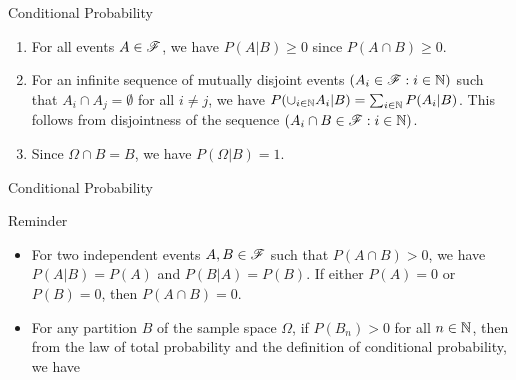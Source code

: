 \documentclass[12pt,aspectratio=169]{beamer}
\begin{document}
\begin{frame}{Conditional Probability}
\begin{Proof} 
\begin{enumerate}
\item <1-> [\textbf{Non-negativity:}] For all events $A \in \mathscr{F}$, we have $P(A|B) \ge 0$ since $P(A \cap B) \ge 0$. 
\item <2-> [\textbf{$\sigma$-additivity:}] For an infinite sequence of mutually disjoint events $(A_i \in \mathscr{F}: i \in \mathbb{N})$ such that $A_i \cap A_j = \emptyset$ for all $i \neq j$, we have $P(\cup_{i \in \mathbb{N}}A_i|B) = \sum_{i \in \mathbb{N}}P(A_i|B)$. 
This follows from disjointness of the sequence $(A_i\cap B \in \mathscr{F}: i \in \mathbb{N})$. 
\item<3->  [\textbf{Certainty:}] Since $\Omega \cap B = B$, we have $P(\Omega |B) = 1$. 
\end{enumerate} 
\end{Proof}
\end{frame}
\begin{frame}{Conditional Probability}
\begin{block}{Reminder}
\begin{itemize}
\item <1-> For two independent events $A, B \in \mathscr{F}$ such that $P(A\cap B) > 0$, 
we have  $P(A|B) = P(A)$ and  $P(B|A) = P(B)$. 
If either $P(A) = 0$ or $P(B) = 0$, then $P(A \cap B) = 0$. 
\item <2-> For any partition $B$ of the sample space $\Omega$, if $P(B_n) > 0$ for all $n \in \mathbb{N}$, then from the law of total probability and the definition of conditional probability, we have 
\end{itemize}
\end{block}
\end{frame}
\end{document}
